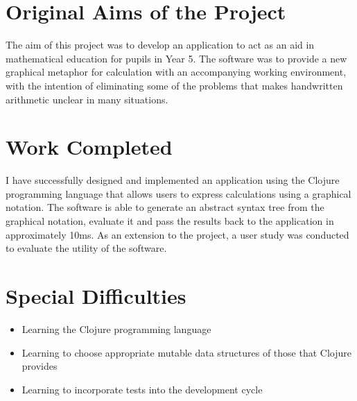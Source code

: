 \documentclass[12pt,twoside,notitlepage,xetex]{report}
\begin{document}
\section*{Original Aims of the Project}

The aim of this project was to develop an application to act as an aid in mathematical education for pupils in Year 5.  The software was to provide a new graphical metaphor for calculation with an accompanying working environment, with the intention of eliminating some of the problems that makes handwritten arithmetic unclear in many situations.


\section*{Work Completed}

I have successfully designed and implemented an application using the Clojure programming language that allows users to express calculations using a graphical notation.  The software is able to generate an abstract syntax tree from the graphical notation, evaluate it and pass the results back to the application in approximately 10ms.  As an extension to the project, a user study was conducted to evaluate the utility of the software.


\section*{Special Difficulties}

\begin{itemize}
\item Learning the Clojure programming language %
\item Learning to choose appropriate mutable data structures of those that Clojure provides
\item Learning to incorporate tests into the development cycle
\end{itemize}
\end{document}
